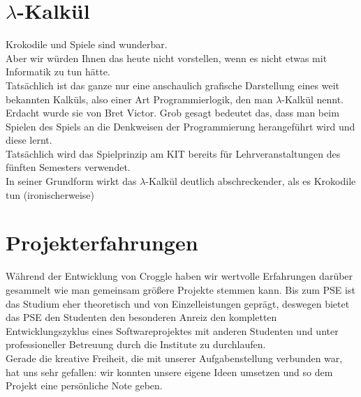 \documentclass{scrartcl}
\begin{document}
	\section{$\lambda$-Kalkül}
	Krokodile und Spiele sind wunderbar.\\
	Aber wir würden Ihnen das heute nicht vorstellen, wenn es nicht etwas mit Informatik zu tun hätte.\\
	Tatsächlich ist das ganze nur eine anschaulich grafische Darstellung eines weit bekannten Kalküls, also einer Art Programmierlogik, den man $\lambda$-Kalkül nennt.\\
	Erdacht wurde sie von Bret Victor.
	Grob gesagt bedeutet das, dass man beim Spielen des Spiels an die Denkweisen der Programmierung herangeführt wird und diese lernt.\\
	Tatsächlich wird das Spielprinzip am KIT bereits für Lehrveranstaltungen des fünften Semesters verwendet.\\
	In seiner Grundform wirkt das $\lambda$-Kalkül deutlich abschreckender, als es Krokodile tun (ironischerweise)\\
	
	\section{Projekterfahrungen}

	Während der Entwicklung von Croggle haben wir wertvolle Erfahrungen darüber gesammelt wie man gemeinsam größere Projekte stemmen kann. Bis zum PSE ist das Studium eher theoretisch und von Einzelleistungen geprägt, deswegen bietet das PSE den Studenten den besonderen Anreiz den kompletten Entwicklungszyklus eines Softwareprojektes mit anderen Studenten und unter professioneller Betreuung durch die Institute zu durchlaufen. \\
	Gerade die kreative Freiheit, die mit unserer Aufgabenstellung verbunden war, hat uns sehr gefallen: wir konnten unsere eigene Ideen umsetzen und so dem Projekt eine persönliche Note geben. \\

	
\end{document}
